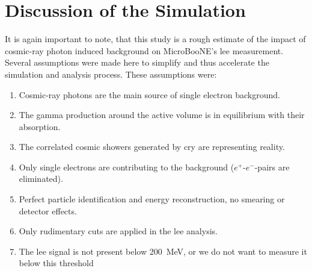 \section{Discussion of the Simulation}
It is again important to note, that this study is a rough estimate of the impact of cosmic-ray photon induced background on MicroBooNE's \gls{lee} measurement. Several assumptions were made here to simplify and thus accelerate the simulation and analysis process. These assumptions were:
\begin{enumerate}
    \item Cosmic-ray photons are the main source of single electron background.
    \item The gamma production around the active volume is in equilibrium with their absorption.
    \item The correlated cosmic showers generated by \gls{cry} are representing reality.
    \item Only single electrons are contributing to the background ($e^+$-$e^-$-pairs are eliminated).
    \item Perfect particle identification and energy reconstruction, \ie no smearing or detector effects.
    \item Only rudimentary cuts are applied in the \gls{lee} analysis.
    \item The \gls{lee} signal is not present below \SI{200}{\mega\electronvolt}, or we do not want to measure it below this threshold
\end{enumerate}
